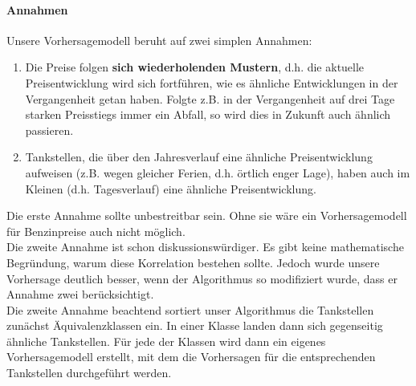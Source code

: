 \documentclass[11pt]{article}
\begin{document}
	\paragraph{Annahmen\\}
	Unsere Vorhersagemodell beruht auf zwei simplen Annahmen: 
	\begin{enumerate}
		\item Die Preise folgen \textbf{sich wiederholenden Mustern}, d.h. die aktuelle Preisentwicklung wird sich fortführen, wie es ähnliche Entwicklungen in der Vergangenheit getan haben. Folgte z.B. in der Vergangenheit auf drei Tage starken Preisstiegs immer ein Abfall, so wird dies in Zukunft auch ähnlich passieren. 
		\item Tankstellen, die über den Jahresverlauf eine ähnliche Preisentwicklung aufweisen (z.B. wegen gleicher Ferien, d.h. örtlich enger Lage), haben auch im Kleinen (d.h. Tagesverlauf) eine ähnliche Preisentwicklung.
	\end{enumerate}	
	Die erste Annahme sollte unbestreitbar sein. Ohne sie wäre ein Vorhersagemodell für Benzinpreise auch nicht möglich. \\
	Die zweite Annahme ist schon diskussionswürdiger. Es gibt keine mathematische Begründung, warum diese Korrelation bestehen sollte. Jedoch wurde unsere Vorhersage deutlich besser, wenn der Algorithmus so modifiziert wurde, dass er Annahme zwei berücksichtigt.\\
	Die zweite Annahme beachtend sortiert unser Algorithmus die Tankstellen zunächst Äquivalenzklassen ein. In einer Klasse landen dann sich gegenseitig ähnliche Tankstellen. Für jede der Klassen wird dann ein eigenes Vorhersagemodell erstellt, mit dem die Vorhersagen für die entsprechenden Tankstellen durchgeführt werden. 
	
\end{document}
